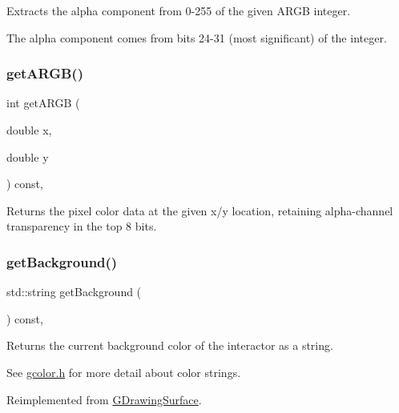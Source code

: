 Extracts the alpha component from 0-\/255 of the given A\+R\+GB integer. 

The alpha component comes from bits 24-\/31 (most significant) of the integer. \mbox{\label{classGDrawingSurface_ae394d39f20476570e083918d991c25bd}} 
\subsubsection{\texorpdfstring{get\+A\+R\+G\+B()}{getARGB()}}
{\footnotesize\ttfamily int get\+A\+R\+GB (\begin{DoxyParamCaption}\item[{double}]{x,  }\item[{double}]{y }\end{DoxyParamCaption}) const\hspace{0.3cm}{\ttfamily [virtual]}, {\ttfamily [inherited]}}



Returns the pixel color data at the given x/y location, retaining alpha-\/channel transparency in the top 8 bits. 

\mbox{\label{classGCanvas_a4a62c51b7244a7642b88065e3a07ae82}} 
\subsubsection{\texorpdfstring{get\+Background()}{getBackground()}}
{\footnotesize\ttfamily std\+::string get\+Background (\begin{DoxyParamCaption}{ }\end{DoxyParamCaption}) const\hspace{0.3cm}{\ttfamily [override]}, {\ttfamily [virtual]}}



Returns the current background color of the interactor as a string. 

See \mbox{\hyperlink{gcolor_8h_source}{gcolor.\+h}} for more detail about color strings. 

Reimplemented from \mbox{\hyperlink{classGDrawingSurface_a808e22cc1fdfbecf71ed8c64ef4600e0}{G\+Drawing\+Surface}}.

\mbox{\label{classGCanvas_acd4f2b3b9619dacdfd71fc0004cac382}} 
